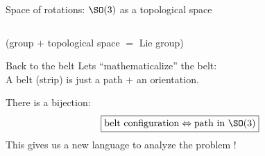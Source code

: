 \documentclass[10pt]{beamer}
\renewcommand{\emph}{\alert}
\begin{document}
\begin{frame}{Space of rotations: $\SO(3)$ as a topological space}
\begin{columns}[T,onlytextwidth]
    \end{columns}

    (group $+$ topological space $=$ Lie group)
    
\end{frame}

\begin{frame}{Back to the belt}
    Lets ``mathematicalize'' the belt:\\[0.3cm]

    A belt (strip) is just a \emph{path} $+$ an \emph{orientation}.

    There is a bijection:
    \begin{equation*}
        \boxed{\text{belt configuration} \Leftrightarrow \text{path in $\SO(3)$}}
    \end{equation*}
    This gives us a new language to analyze the problem !
\end{frame}
\end{document}
